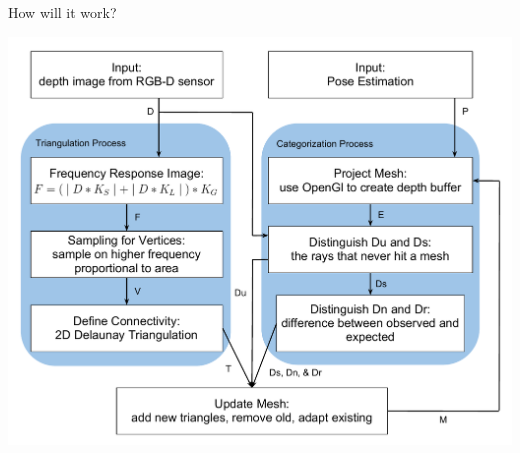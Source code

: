 \documentclass{beamer}
\begin{document}
\begin{frame}{How will it work?}
\vspace{-.2in}
  \begin{center}
  \includegraphics[width=.9\textwidth]{SD.pdf} 
  \end{center}
\end{frame}
\end{document}

